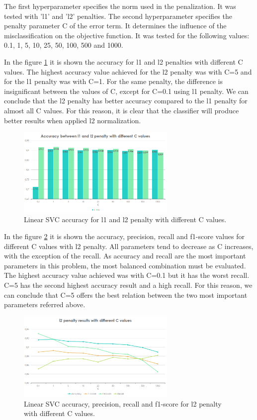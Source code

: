 \documentclass[journal]{IEEEtran}
\begin{document}
The first hyperparameter specifies the norm used in the penalization. It was tested with 'l1' and 'l2' penalties.
The second hyperparameter specifies the penalty parameter C of the error term. It determines the influence of the misclassification on the objective function. It was tested for the following values: 0.1, 1, 5, 10, 25, 50, 100, 500 and 1000.

In the figure \ref{lsvcaccuracy} it is shown the accuracy for l1 and l2 penalties with different C values. The highest accuracy value achieved for the l2 penalty was with C=5 and for the l1 penalty was with C=1. For the same penalty, the difference is insignificant between the values of C, except for C=0.1 using l1 penalty. We can conclude that the l2 penalty has better accuracy compared to the l1 penalty for almost all C values. For this reason, it is clear that the classifier will produce better results when applied l2 normalization.

\begin{figure}[!t]
\centering
\includegraphics[width=3in]{lsvc1_w}
\caption{Linear SVC accuracy for l1 and l2 penalty with different C values.}
\label{lsvcaccuracy}
\end{figure}

In the figure \ref{lsvcaprf} it is shown the accuracy, precision, recall and f1-score values for different C values with l2 penalty. All parameters tend to decrease as C increases, with the exception of the recall. As accuracy and recall are the most important parameters in this problem, the most balanced combination must be evaluated. The highest accuracy value achieved was with C=0.1 but it has the worst recall. C=5 has the second highest accuracy result and a high recall. For this reason, we can conclude that C=5 offers the best relation between the two most important parameters referred above.

\begin{figure}[!t]
\centering
\includegraphics[width=3in]{lsvc2_w}
\caption{Linear SVC accuracy, precision, recall and f1-score for l2 penalty with different C values.}
\label{lsvcaprf}
\end{figure}
\end{document}
